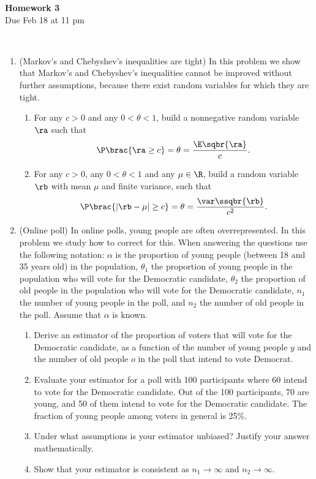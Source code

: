 \documentclass[12pt,twoside]{article}
\begin{document}
\begin{center}
{\large{\textbf{Homework 3}} } \vspace{0.2cm}\\
Due Feb 18 at 11 pm
\\
\end{center}
\\

\begin{enumerate}


\item (Markov's and Chebyshev's inequalities are tight)
In this problem we show that Markov's and Chebyshev's inequalities cannot be improved without further assumptions, because there exist random variables for which they are tight. 
\begin{enumerate}
\item For any $c >0$ and any $0 < \theta < 1$, build a nonnegative random variable $\ra$ such that 
\begin{align}
\P\brac{\ra \geq c} = \theta = \frac{\E\sqbr{ \ra }}{c}.
\end{align} 
\item For any $c >0$, any $0 < \theta < 1$ and any $\mu \in \R$, build a random variable $\rb$ with mean $\mu$ and finite variance, such that 
\begin{align}
\P\brac{ | \rb - \mu | \geq c} = \theta = \frac{\var\ssqbr{\rb} }{c^2}.
\end{align} 
\end{enumerate}

\item (Online poll) In online polls, young people are often overrepresented. In this problem we study how to correct for this. When answering the questions use the following notation: $\alpha$ is the proportion of young people (between 18 and 35 years old) in the population, $\theta_1$ the proportion of young people in the population who will vote for the Democratic candidate, $\theta_2$ the proportion of old people in the population who will vote for the Democratic candidate, $n_1$ the number of young people in the poll, and $n_2$ the number of old people in the poll. Assume that $\alpha$ is known.
\begin{enumerate}
\item Derive an estimator of the proportion of voters that will vote for the Democratic candidate, as a function of the number of young people $y$ and the number of old people $o$ in the poll that intend to vote Democrat. 
\item Evaluate your estimator for a poll with 100 participants where 60 intend to vote for the Democratic candidate. Out of the 100 participants, 70 are young, and 50 of them intend to vote for the Democratic candidate. The fraction of young people among voters in general is 25\%. 
\item Under what assumptions is your estimator unbiased? Justify your answer mathematically.
\item Show that your estimator is consistent as $n_1 \rightarrow \infty$ and  $n_2 \rightarrow \infty$.
\end{enumerate}




\end{enumerate}
\end{document}
